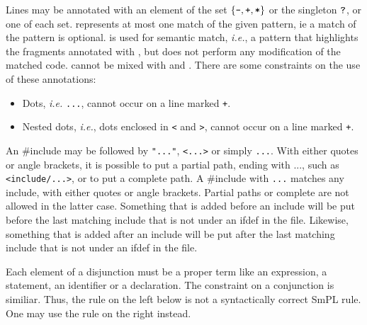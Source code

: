 \begin{grammar}
  \CASE{}


\end{grammar}

\noindent
Lines may be annotated with an element of the set $\{\mbox{\tt{{-}}}, \mbox{\tt{{+}}},
\mbox{\tt{{*}}}\}$ or the singleton $\mbox{\tt{{?}}}$, or one of each set. 
represents at most one match of the given pattern, ie a match of the
pattern is optional. \mtt{*} is used for
semantic match, \emph{i.e.}, a pattern that highlights the fragments
annotated with \mtt{*}, but does not perform any modification of the
matched code. \mtt{*} cannot be mixed with \mtt{-} and \mtt{+}.  There are
some constraints on the use of these annotations:
\begin{itemize}
\item Dots, {\em i.e.} \texttt{...}, cannot occur on a line marked
  \texttt{+}.
\item Nested dots, {\em i.e.}, dots enclosed in {\tt <} and {\tt >}, cannot
  occur on a line marked \texttt{+}.
\end{itemize}

An \#include may be followed by \texttt{"..."}, \texttt{<...>} or simply
\texttt{...}.  With either quotes or angle brackets, it is possible to put
a partial path, ending with ..., such as \texttt{<include/...>}, or to put a
complete path.  A \#include with \texttt{...} matches any include, with
either quotes or angle brackets.  Partial paths or complete are not allowed
in the latter case.  Something that is added before an include will be put
before the last matching include that is not under an ifdef in the file.
Likewise, something that is added after an include will be put after the
last matching include that is not under an ifdef in the file.

Each element of a disjunction must be a proper term like an expression, a
statement, an identifier or a declaration. The constraint on a conjunction
is similiar.  Thus, the rule on the left below is not a syntactically
correct SmPL rule. One may use the rule on the right instead.

